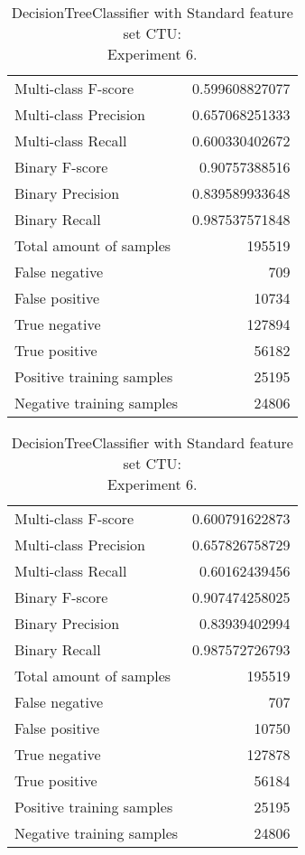 \begin{table}[H]
\begin{minipage}{0.5\textwidth}
\caption{DecisionTreeClassifier with Standard feature set CTU: \\Experiment 5.}
\centering
\begin{tabular}{l r}
\toprule
Multi-class F-score & 0.599608827077 \\
Multi-class Precision & 0.657068251333 \\
Multi-class Recall & 0.600330402672 \\
\midrule
Binary F-score & 0.90757388516 \\
Binary Precision & 0.839589933648 \\
Binary Recall & 0.987537571848 \\
\midrule
Total amount of samples & 195519 \\
False negative & 709 \\
False positive & 10734 \\
True negative & 127894 \\
True positive & 56182 \\
\midrule
Positive training samples & 25195 \\
Negative training samples & 24806 \\
\bottomrule
\end{tabular}
\end{minipage}
\hfillx
\begin{minipage}{0.5\textwidth}
\caption{DecisionTreeClassifier with Standard feature set CTU: \\Experiment 6.}
\centering
\begin{tabular}{l r}
\toprule
Multi-class F-score & 0.600791622873 \\
Multi-class Precision & 0.657826758729 \\
Multi-class Recall & 0.60162439456 \\
\midrule
Binary F-score & 0.907474258025 \\
Binary Precision & 0.83939402994 \\
Binary Recall & 0.987572726793 \\
\midrule
Total amount of samples & 195519 \\
False negative & 707 \\
False positive & 10750 \\
True negative & 127878 \\
True positive & 56184 \\
\midrule
Positive training samples & 25195 \\
Negative training samples & 24806 \\
\bottomrule
\end{tabular}
\end{minipage}
\end{table}




